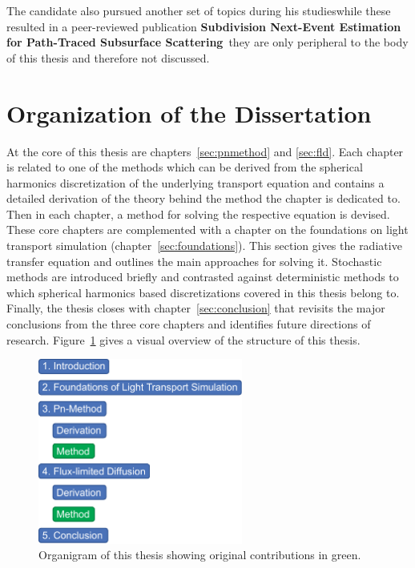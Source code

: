 The candidate also pursued another set of topics during his studies\mydash while these resulted in a peer-reviewed publication \textbf{Subdivision Next-Event Estimation for Path-Traced Subsurface Scattering}~\cite{Koerner16}\mydash they are only peripheral to the body of this thesis and therefore not discussed.

\section{Organization of the Dissertation}

At the core of this thesis are chapters~\ref{sec:pnmethod} and \ref{sec:fld}. Each chapter is related to one of the methods which can be derived from the spherical harmonics discretization of the underlying transport equation and contains a detailed derivation of the theory behind the method the chapter is dedicated to. Then in each chapter, a method for solving the respective equation is devised. These core chapters are complemented with a chapter on the foundations on light transport simulation (chapter~\ref{sec:foundations}). This section gives the radiative transfer equation and outlines the main approaches for solving it. Stochastic methods are introduced briefly and contrasted against deterministic methods to which spherical harmonics based discretizations covered in this thesis belong to. Finally, the thesis closes with chapter~\ref{sec:conclusion} that revisits the major conclusions from the three core chapters and identifies future directions of research. Figure~\ref{fig:intro_organization} gives a visual overview of the structure of this thesis.
\begin{figure}[ht]
\hspace{0.1\columnwidth}
\includegraphics[width=0.6\textwidth]{02_Introduction/figures/fig_organigram.pdf}
\caption{Organigram of this thesis showing original contributions in green.}
\label{fig:intro_organization}
\end{figure}








